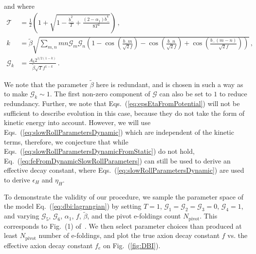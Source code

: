 \documentclass[12pt]{article}
\begin{document}
and where
\begin{align} %
  \mathcal{T} &= \frac{1}{2} \left(
      1
    + \sqrt{1 - \frac{{\dot b}_-^2}{T} + \frac{\left(2 - \alpha_1\right){\dot b}_-^4}{8 T^2}}
  \right)\,,\\
  \label{eq:dbi:beta}
  k &= \tilde\beta \sqrt{\sum_{m, n} m n \mathcal{G}_m \mathcal{G}_n \left(
      1
    - \cos\left(\frac{b_- m}{\sqrt{2} f}\right)
    - \cos\left(\frac{b_- n}{\sqrt{2} f}\right)
    + \cos\left(\frac{b_- \left(m - n\right)}{\sqrt{2} f}\right)
  \right)}\,,\\
  \mathcal{G}_k &= \frac{A_k 2^{1 / 2 \left(1 - k\right)}}{\tilde\beta \sqrt{T} f^{1 - k}}\,.
\end{align}

We note that the parameter $\tilde\beta$ here is redundant, and is chosen in such a way as to make $\mathcal{G}_k \sim 1$.
The first non-zero component of $\mathcal{G}$ can also be set to $1$ to reduce redundancy.
Further, we note that Eqs.~(\ref{eq:epsEtaFromPotential}) will not be sufficient to describe evolution in this case, because they do not take the form of kinetic energy into account.
However, we will use Eqs.~(\ref{eq:slowRollParametersDynamic}) which are independent of the kinetic terms, therefore, we conjecture that while Eqs.~(\ref{eq:slowRollParametersDynamicFromStatic}) do not hold, Eq.~(\ref{eq:feFromDynamicSlowRollParameters}) can still be used to derive an effective decay constant, where Eqs.~(\ref{eq:slowRollParametersDynamic}) are used to derive $\epsilon_H$ and $\eta_H$.

To demonstrate the validity of our procedure, we sample the parameter space of the model Eq.~(\ref{eq:dbi:lagrangian}) by setting $T = 1$, $\mathcal{G}_1 = \mathcal{G}_2 = \mathcal{G}_3 = 0$, $\mathcal{G}_4 = 1$, and varying $\mathcal{G}_5$, $\mathcal{G}_6$, $\alpha_1$, $f$, $\tilde\beta$, and the pivot e-foldings count $N_\text{pivot}$.
This corresponds to Fig.~(1) of~\cite{Nath:2018xxe}.
We then select parameter choices than produced at least $N_\text{pivot}$ number of e-foldings, and plot the true axion decay constant $f$ vs. the effective axion decay constant $f_e$ on Fig.~(\ref{fig:DBI}).
\end{document}
